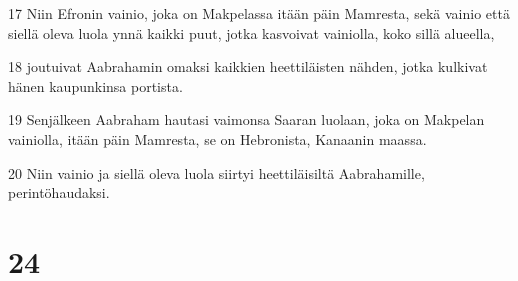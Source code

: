 \par 17 Niin Efronin vainio, joka on Makpelassa itään päin Mamresta, sekä vainio että siellä oleva luola ynnä kaikki puut, jotka kasvoivat vainiolla, koko sillä alueella,
\par 18 joutuivat Aabrahamin omaksi kaikkien heettiläisten nähden, jotka kulkivat hänen kaupunkinsa portista.
\par 19 Senjälkeen Aabraham hautasi vaimonsa Saaran luolaan, joka on Makpelan vainiolla, itään päin Mamresta, se on Hebronista, Kanaanin maassa.
\par 20 Niin vainio ja siellä oleva luola siirtyi heettiläisiltä Aabrahamille, perintöhaudaksi.

\chapter{24}

